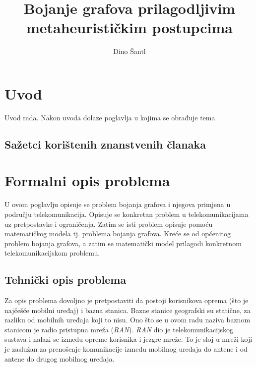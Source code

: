 \documentclass[times, utf8, diplomski, numeric]{fer}
\begin{document}

\title{Bojanje grafova prilagodljivim metaheurističkim postupcima}

\author{Dino Šantl}

\maketitle

\izvornik

\zahvala{}

\tableofcontents

\chapter{Uvod}
Uvod rada. Nakon uvoda dolaze poglavlja u kojima se obrađuje tema.

\section{Sažetci korištenih znanstvenih članaka}

\chapter{Formalni opis problema}

U ovom poglavlju opisuje se problem bojanja grafova i njegova primjena u području telekomunikacija. Opisuje se konkretan problem u telekomunikacijama uz pretpostavke i ograničenja. Zatim se isti problem opisuje pomoću matematičkog modela tj. problema bojanja grafova. Kreće se od općenitog problem bojanja grafova, a zatim se matematički model prilagodi konkretnom telekomunikacijskom problemu.

\section{Tehnički opis problema}

Za opis problema dovoljno je pretpostaviti da postoji korisnikova oprema (što je najčešće mobilni uređaj) i bazna stanica. Bazne stanice geografski su statične, za razliku od mobilnih uređaja koji to nisu.
Ono što se u ovom radu naziva baznom stanicom je radio pristupna mreža  (\emph{RAN}). \emph{RAN} dio je telekomunikacijskog sustava i nalazi se između opreme korisnika i jezgre mreže. To je sloj u mreži koji je zaslužan za prenošenje komunikacije između mobilnog uređaja do antene i od antene do drugog mobilnog uređaja. 
\end{document}
